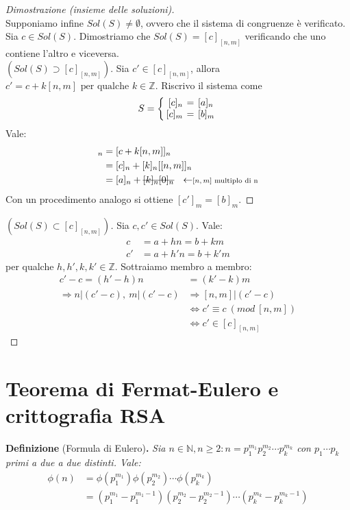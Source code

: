 \documentclass[12pt]{article}
\newcommand{\N}{\mathbb{N}}
\newcommand{\Z}{\mathbb{Z}}
\newcommand{\sesolose}{\Leftrightarrow}
\newcommand{\implica}{\Longrightarrow}
\newcommand{\pq}{\text{ per qualche }}
\renewcommand\qedsymbol{$\blacksquare$}
\newcommand{\stkout}[1]{\ifmmode\text{\sout{\ensuremath{#1}}}\else\sout{#1}\fi}
\begin{document}
\begin{proof}[Dimostrazione (insieme delle soluzioni)]\ \\
	Supponiamo infine $Sol(S) \ne \emptyset$, ovvero che il sistema di congruenze è verificato. Sia $c \in Sol(S)$. Dimostriamo che $Sol(S) = [c]_{[n,m]}$ verificando che uno contiene l'altro e viceversa.
	\\[1\baselineskip]$(Sol(S) \supset [c]_{[n,m]})$.
	Sia $ c' \in [c]_{[n,m]}$, allora $c' = c + k[n,m] \pq k \in \Z$. Riscrivo il sistema come
	\[
		S = \left\{
		\setlength\arraycolsep{2pt}
		\begin{array}{rcl} [c]_n & = & [a]_n \\ \relax
			[c]_m       & = & [b]_m
		\end{array}\right
		.
	\]
	Vale:
	\begin{align*}
		[c']_n & = [c + k[n,m]]_n                                                                         \\
		       & = [c]_n + [k]_n [[n,m]]_n                                                                \\
		       & = [a]_n + \stkout{[k]_n [0]_n} \ \ \leftarrow\scriptstyle{ \text{$[n,m]$ multiplo di n}}
	\end{align*}
	Con un procedimento analogo si ottiene $[c']_m = [b]_m$.
\end{proof}
\renewcommand\qedsymbol{$\blacksquare$}
\begin{proof}[$(Sol(S) \subset {[c]}_{[n,m]})$]
	Sia $c, c' \in Sol(S)$. Vale:
	\begin{align*}
		c  & = a+hn = b + km   \\
		c' & = a+h'n = b + k'm
	\end{align*}
	per qualche $h, h', k, k' \in \Z$. Sottraiamo membro a membro:
	\begin{align*}
		c' - c = (h' - h)n                & = (k' - k)m                            \\
		\implica n | (c' -c),\ m|(c' - c) & \implica [n, m]|(c' - c)               \\
		                                  & \sesolose c' \equiv c \ (mod \ [n, m]) \\
		                                  & \sesolose c' \in [c]_{[n,m]}
	\end{align*}
\end{proof}

\section{Teorema di Fermat-Eulero e crittografia RSA}
\textbf{Definizione} (Formula di Eulero)\textbf{.} \textit{Sia $n \in \N, n \ge 2: n = p^{m_1}_1 p^{m_2}_2 \cdots p^{m_k}_k$ con $p_1 \cdots p_k$ primi a due a due distinti. Vale:
	\begin{align*}
		\phi(n) & = \phi(p^{m_1}_1)\phi(p^{m_2}_2) \cdots \phi(p^{m_k}_k)                                      \\
		        & = (p^{m_1}_1 - p^{m_1 - 1}_1) (p^{m_2}_2 - p^{m_2 - 1}_2) \cdots (p^{m_k}_k - p^{m_k - 1}_k)
	\end{align*}
}
\end{document}

